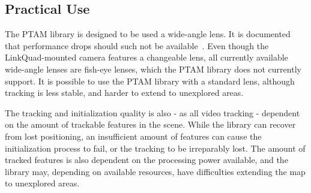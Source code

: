         \subsection{Practical Use}
            The PTAM library is designed to be used a wide-angle lens. It is
            documented that performance drops should such not be available~\citep{klein07parallel}.
            Even though the LinkQuad-mounted camera features a changeable lens, all currently
            available wide-angle lenses are fish-eye lenses, which the PTAM library does not currently support.
            It is possible to use the PTAM library with a standard lens, although
            tracking is less stable, and harder to extend to unexplored areas.

            The tracking and initialization quality is also - as all video tracking - dependent on the
            amount of trackable features in the scene.
            While the library can recover from lost positioning, an insufficient amount
            of features can cause the initialization process to fail, or the tracking to
            be irreparably lost.
            The amount of tracked features is also dependent on the processing
            power available, and the library may, depending on available resources,
            have difficulties extending the map to unexplored areas.
